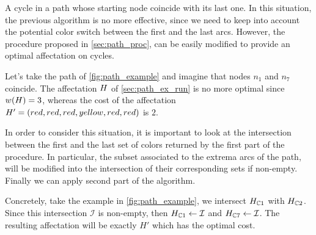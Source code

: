 A cycle in a path whose starting node coincide with its last one.
In this situation, the previous algorithm is no more effective, since we need to keep into account the potential color switch between the first and the last arcs.
However, the procedure proposed in \cref{sec:path_proc}, can be easily modified to provide an optimal affectation on cycles.

Let's take the path of \cref{fig:path_example} and imagine that nodes $n_1$ and $n_7$ coincide.
The affectation $H$ of \cref{sec:path_ex_run} is no more optimal since $w(H) = 3$, whereas the cost of the affectation $H' = (red, red, red, yellow, red, red)$ is $2$.

In order to consider this situation, it is important to look at the intersection between the first and the last set of colors returned by the first part of the procedure. In particular, the subset associated to the extrema arcs of the path, will be modified into the intersection of their corresponding sets if non-empty. Finally we can apply second part of the algorithm.

Concretely, take the example in \cref{fig:path_example}, we intersect $H_{\mathbb{C}1}$ with $H_{\mathbb{C}2}$. Since this intersection $\mathcal{I}$ is non-empty, then $H_{\mathbb{C}1} \gets \mathcal{I}$ and $H_{\mathbb{C}7} \gets \mathcal{I}$. The resulting affectation will be exactly $H'$ which has the optimal cost.

